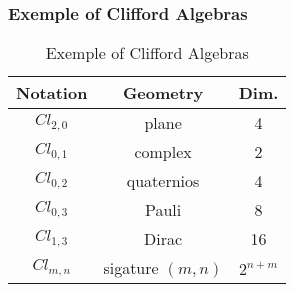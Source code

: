 \label{hyperlinks}
\begin{frame}\frametitle{Exemple of Clifford Algebras}


\begin{center}

\end{center}


\begin{table}[htp]
 \centering
\begin{tabular}{ccc}\hline

\textbf{Notation} & \textbf{Geometry} & \textbf{Dim.}\\\hline
$Cl_{2,0}$ & plane & 4\\\hline
$Cl_{0,1}$ & complex & 2\\\hline
$Cl_{0,2}$ & quaternios & 4\\\hline
$Cl_{0,3}$ & Pauli & 8\\\hline
$Cl_{1,3}$ & Dirac & 16\\\hline
$Cl_{m,n}$ & sigature $(m,n)$ & $2^{n+m}$\\\hline
\end{tabular}

 \caption{Exemple of Clifford Algebras}
\end{table}




\end{frame}
